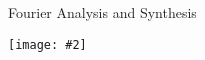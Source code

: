 \documentclass[12pt,compress,aspectratio=169]{beamer}
\newcommand{\pic}[2]{\texttt{[image: \#2]}}
\begin{document}
%



\begin{frame}{Fourier Analysis and Synthesis}
  \begin{center}
    \pic{.6}{Fourier-xform.png}
  \end{center}
\end{frame}
\end{document}
